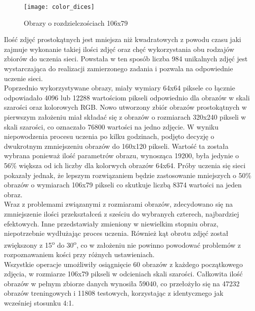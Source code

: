 \begin{figure}[h]
\centering
\texttt{[image: color\_dices]}
\caption{Obrazy o rozdzielczościach 106x79}
\end{figure}

Ilość zdjęć prostokątnych jest mniejsza niż kwadratowych z powodu czasu jaki zajmuje
wykonanie takiej ilości zdjęć oraz chęć wykorzystania obu rodzajów zbiorów do uczenia sieci.
Powstała w ten sposób liczba 984 unikalnych zdjęć jest wystarczająca do realizacji
zamierzonego zadania i pozwala na odpowiednie uczenie sieci. \\
Poprzednio wykorzystywane obrazy, miały wymiary 64x64 piksele co łącznie odpowiadało
4096 lub 12288 wartościom pikseli odpowiednio dla obrazów w skali szarości oraz
kolorowych RGB. Nowo utworzony zbiór obrazów prostokątnych w pierwszym założeniu miał
składać się z obrazów o rozmiarach 320x240 pikseli w skali szarości, co oznaczało
76800 wartości na jedno zdjęcie. W wyniku niepowodzenia procesu uczenia po kilku godzinach,
podjęto decyzję o dwukrotnym zmniejszeniu obrazów do 160x120 pikseli. Wartość ta
została wybrana ponieważ ilość parametrów obrazu, wynosząca 19200, była jedynie o 56\%
większa od ich liczby dla kolorwych obrazów 64x64. Próby uczenia się sieci pokazały jednak,
że lepszym rozwiązaniem będzie zastosowanie mniejszych o 50\% obrazów o wymiarach
106x79 pikseli co skutkuje liczbą 8374 wartości na jeden obraz.\\
Wraz z problemami związanymi z rozmiarami obrazów, zdecydowano się na zmniejszenie ilości
przekształceń z sześciu do wybranych czterech, najbardziej efektowych. Inne przedstawiały
zmieniony w niewielkim stopniu obraz, niepotrzebnie wydłużając proces
uczenia. Również kąt obrotu zdjęć został zwiększony z 15\textsuperscript{o}
do 30\textsuperscript{o}, co w założeniu nie powinno powodować problemów z rozpoznawaniem
kości przy różnych ustawieniach. \\
Wszystkie operacje umożliwiły osiągnięcie 60 obrazów z każdego początkowego zdjęcia, w rozmiarze
106x79 pikseli w odcieniach skali szarości. Całkowita ilość obrazów w pełnym zbiorze
danych wynosiła 59040, co przełożyło się na 47232 obrazów treningowych i 11808 testowych,
korzystając z identycznego jak wcześniej stosunku 4:1.
